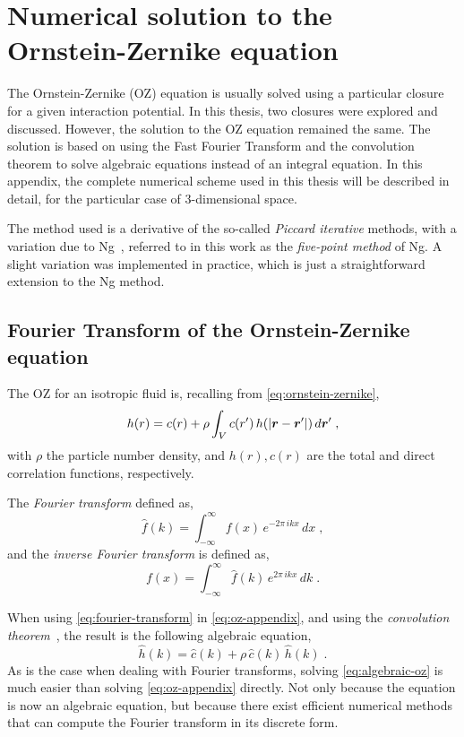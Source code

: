 \chapter{Numerical solution to the Ornstein-Zernike equation}
\label{AppendixB}

The Ornstein-Zernike (OZ) equation is usually solved using a particular closure for a given 
interaction potential. In this thesis, two closures were explored and discussed. However, 
the solution to the OZ equation remained the same. The solution is based on using the Fast 
Fourier Transform and the convolution theorem to solve algebraic equations instead of an 
integral equation. In this appendix, the complete numerical scheme used in this thesis will 
be described in detail, for the particular case of \(3\)-dimensional space.

The method used is a derivative of the so-called \emph{Piccard iterative} methods, with a 
variation due to Ng~\cite{ngHypernettedChainSolutions1974}, referred to in this work as the 
\emph{five-point method} of Ng. A slight variation was implemented in practice, which is 
just a straightforward extension to the Ng method.

\section{Fourier Transform of the Ornstein-Zernike equation}
The OZ for an isotropic fluid is, recalling from \autoref{eq:ornstein-zernike},
\begin{equation}
    h(r) = c(r) + \rho \int_{V} c(r') \, h(\lvert \bm{r} - \bm{r}' \rvert) \, d \bm{r}'
    \; ,
    \label{eq:oz-appendix}
\end{equation}
with \(\rho\) the particle number density, and \(h(r), c(r)\) are the total and direct correlation functions, respectively.

The \emph{Fourier transform} defined as,
\begin{equation}
    \hat{f}(k) = \int_{- \infty}^{\infty} f(x) \, e^{-2 \pi \, i k x} \, dx
    \; ,
    \label{eq:fourier-transform}
\end{equation}
and the \emph{inverse Fourier transform} is defined as,
\begin{equation}
    f(x) = \int_{- \infty}^{\infty} \hat{f}(k) \, e^{2 \pi \, i k x} \, dk
    \; .
    \label{eq:inv-fourier-transform}
\end{equation}

When using \autoref{eq:fourier-transform} in \autoref{eq:oz-appendix}, and using the 
\emph{convolution theorem}~\cite{kornerFourierAnalysis1989}, the result is the following 
algebraic equation,
\begin{equation}
    \hat{h}(k) = \hat{c}(k) + \rho \, \hat{c}(k) \, \hat{h}(k)
    \; .
    \label{eq:algebraic-oz}
\end{equation}
As is the case when dealing with Fourier transforms, solving \autoref{eq:algebraic-oz} is 
much easier than solving \autoref{eq:oz-appendix} directly. Not only because the equation 
is now an algebraic equation, but because there exist efficient numerical methods that can 
compute the Fourier transform in its discrete form.


